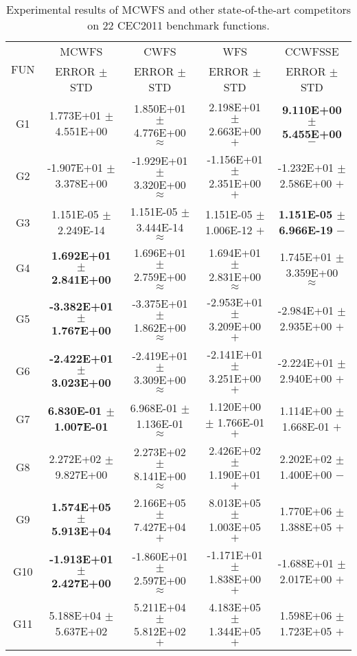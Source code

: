 \documentclass[paper]{ieice}
\begin{document}
\begin{table*}[htbp]  
	\caption{Experimental results of MCWFS and other state-of-the-art competitors on 22 CEC2011 benchmark functions.}  \label{cec2011}
	\centering

	\begin{tabular}{c|c|c|c|c}
		\hline
		\multirow{2}{*}{FUN}	&	MCWFS				&	CWFS				&	WFS				&	CCWFSSE				\\   \cline{2-5}
		&	ERROR	$\pm$	STD		&	ERROR	$\pm$	STD		&	ERROR	$\pm$	STD		&	ERROR	$\pm$	STD		\\ \hline
		G1	&	1.773E+01	$\pm$	4.551E+00		&	1.850E+01	$\pm$	4.776E+00	$\approx$	&	2.198E+01	$\pm$	2.663E+00	$+$	&	\textbf{9.110E+00	$\pm$	5.455E+00}	$-$	\\
		G2	&	-1.907E+01	$\pm$	3.378E+00		&	-1.929E+01	$\pm$	3.320E+00	$\approx$	&	-1.156E+01	$\pm$	2.351E+00	$+$	&	-1.232E+01	$\pm$	2.586E+00	$+$	\\
		G3	&	1.151E-05	$\pm$	2.249E-14		&	1.151E-05	$\pm$	3.444E-14	$\approx$	&	1.151E-05	$\pm$	1.006E-12	$+$	&	\textbf{1.151E-05	$\pm$	6.966E-19}	$-$	\\
		G4	&	\textbf{1.692E+01	$\pm$	2.841E+00}		&	1.696E+01	$\pm$	2.759E+00	$\approx$	&	1.694E+01	$\pm$	2.831E+00	$\approx$	&	1.745E+01	$\pm$	3.359E+00	$\approx$	\\
		G5	&	\textbf{-3.382E+01	$\pm$	1.767E+00}		&	-3.375E+01	$\pm$	1.862E+00	$\approx$	&	-2.953E+01	$\pm$	3.209E+00	$+$	&	-2.984E+01	$\pm$	2.935E+00	$+$	\\
		G6	&	\textbf{-2.422E+01	$\pm$	3.023E+00}		&	-2.419E+01	$\pm$	3.309E+00	$\approx$	&	-2.141E+01	$\pm$	3.251E+00	$+$	&	-2.224E+01	$\pm$	2.940E+00	$+$	\\
		G7	&	\textbf{6.830E-01	$\pm$	1.007E-01}		&	6.968E-01	$\pm$	1.136E-01	$\approx$	&	1.120E+00	$\pm$	1.766E-01	$+$	&	1.114E+00	$\pm$	1.668E-01	$+$	\\
		G8	&	2.272E+02	$\pm$	9.827E+00		&	2.273E+02	$\pm$	8.141E+00	$\approx$	&	2.426E+02	$\pm$	1.190E+01	$+$	&	2.202E+02	$\pm$	1.400E+00	$-$	\\
		G9	&	\textbf{1.574E+05	$\pm$	5.913E+04}		&	2.166E+05	$\pm$	7.427E+04	$+$	&	8.013E+05	$\pm$	1.003E+05	$+$	&	1.770E+06	$\pm$	1.388E+05	$+$	\\
		G10	&	\textbf{-1.913E+01	$\pm$	2.427E+00}		&	-1.860E+01	$\pm$	2.597E+00	$\approx$	&	-1.171E+01	$\pm$	1.838E+00	$+$	&	-1.688E+01	$\pm$	2.017E+00	$+$	\\
		G11	&	5.188E+04	$\pm$	5.637E+02		&	5.211E+04	$\pm$	5.812E+02	$+$	&	4.183E+05	$\pm$	1.344E+05	$+$	&	1.598E+06	$\pm$	1.723E+05	$+$	\\

\end{tabular}
\end{table*}
\end{document}
